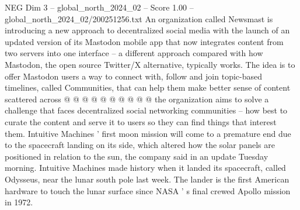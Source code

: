 \begin{textsample}{NEG Dim 3 – global\_north\_2024\_02 – Score 1.00 – global\_north\_2024\_02/200251256.txt}
An organization called Newsmast is introducing a new approach to decentralized social media with the launch of an updated version of its Mastodon mobile app that now integrates content from two servers into one interface -- a different approach compared with how Mastodon, the open source Twitter/X alternative, typically works.
The idea is to offer Mastodon users a way to connect with, follow and join topic-based timelines, called Communities, that can help them make better sense of content scattered across @ @ @ @ @ @ @ @ @ @ the organization aims to solve a challenge that faces decentralized social networking communities -- how best to curate the content and serve it to users so they can find things that interest them.
Intuitive Machines ' first moon mission will come to a premature end due to the spacecraft landing on its side, which altered how the solar panels are positioned in relation to the sun, the company said in an update Tuesday morning.
Intuitive Machines made history when it landed its spacecraft, called Odysseus, near the lunar south pole last week.
The lander is the first American hardware to touch the lunar surface since NASA ' s final crewed Apollo mission in 1972.

\end{textsample}
